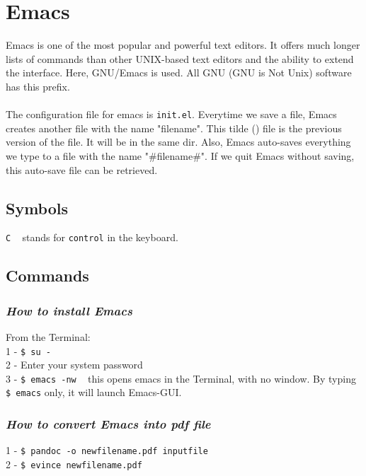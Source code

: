 \documentclass{article}
\begin{document}
{{{\newpage
\section{Emacs}
Emacs is one of the most popular and powerful text editors. It offers much longer lists of commands than other UNIX-based text editors and the ability to extend the interface. Here, GNU/Emacs is used. All GNU (GNU is Not Unix) software has this prefix. \\
\\
The configuration file for emacs is \texttt{init.el}. Everytime we save a file, Emacs creates another file with the name "filename\texttildelow". This tilde (\texttildelow) file is the previous version of the file. It will be in the same dir. Also, Emacs auto-saves everything we type to a file with the name "#filename#". If we quit Emacs without saving, this auto-save file can be retrieved. \\

\subsection{Symbols}
\texttt{C} ~ stands for \texttt{control} in the keyboard.\\

\subsection{Commands}
\subsubsection{\small\textsl{How to install Emacs }}
From the Terminal:\\
1 - \texttt{\$ su -}\\
2 - Enter your system password\\
3 - \texttt{\$ emacs -nw} ~ this opens emacs in the Terminal, with no window. By typing \texttt{\$ emacs} only, it will launch Emacs-GUI.

\subsubsection{\small\textsl{How to convert Emacs into pdf file}}
1 - \texttt{\$ pandoc -o newfilename.pdf inputfile}\\
2 - \texttt{\$ evince newfilename.pdf} 

}}}
\end{document}
